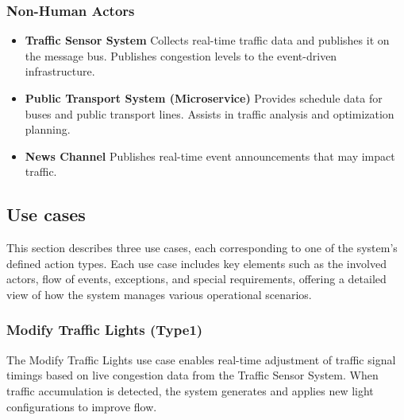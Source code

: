 \documentclass[11.5pt]{article}
\begin{document}
    \subsubsection{Non-Human Actors}
    \begin{itemize}
        \item \textbf{Traffic Sensor System}
    Collects real-time traffic data and publishes it on the message bus.
    Publishes congestion levels to the event-driven infrastructure.
    \item \textbf{Public Transport System (Microservice)}
    Provides schedule data for buses and public transport lines.
    Assists in traffic analysis and optimization planning.
    \item \textbf {News Channel}
    Publishes real-time event announcements that may impact traffic.
    \end{itemize}
    
    \subsection{Use cases}

    This section describes three use cases, each corresponding to one of the system's defined action types. Each use case includes key elements such as the involved actors, flow of events, exceptions, and special requirements, offering a detailed view of how the system manages various operational scenarios.
    
    \subsubsection{Modify Traffic Lights (Type1)}

    The Modify Traffic Lights use case enables real-time adjustment of traffic signal timings based on live congestion data from the Traffic Sensor System. When traffic accumulation is detected, the system generates and applies new light configurations to improve flow. 
    
\end{document}
